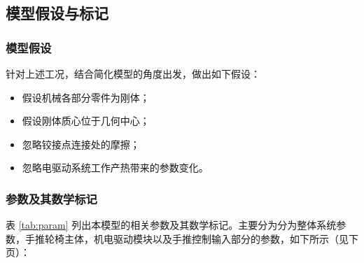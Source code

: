 \subsection{模型假设与标记}

\subsubsection{模型假设}

针对上述工况，结合简化模型的角度出发，做出如下假设：

\begin{itemize}
	
	\item 假设机械各部分零件为刚体；
	
	\item 假设刚体质心位于几何中心；
	
	\item 忽略铰接点连接处的摩擦；
	
	\item 忽略电驱动系统工作产热带来的参数变化。
	
\end{itemize}

\subsubsection{参数及其数学标记}

表 \ref{tab:param} 列出本模型的相关参数及其数学标记。主要分为分为整体系统参数，手推轮椅主体，机电驱动模块以及手推控制输入部分的参数，如下所示（见下页）：

